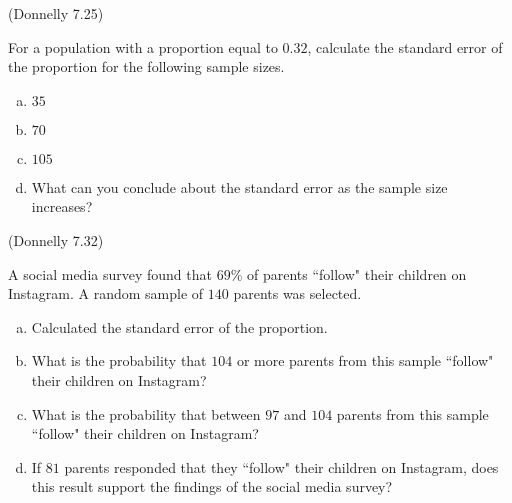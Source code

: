 \documentclass[12pt, letterpaper]{article}
\newcounter{exercise}
\theoremstyle{definition}
\begin{document}
\begin{exercise}  (Donnelly 7.25)

For a population with a proportion equal to $0.32$, calculate the standard error of the proportion for the following sample sizes.

\end{exercise}

\begin{enumerate}[(a)]

\item $35$

\vfill

\item $70$

\vfill

\item $105$

\vfill

\item What can you conclude about the standard error as the sample size increases?

\vfill

\end{enumerate}


\newpage

\begin{exercise}  (Donnelly 7.32)

A social media survey found that $69\%$ of parents ``follow" their children on Instagram.  A random sample of $140$ parents was selected.

\end{exercise}

\begin{enumerate}[(a)]

\item Calculated the standard error of the proportion.

\vfill

\item What is the probability that $104$ or more parents from this sample ``follow" their children on Instagram?

\vfill
\vfill

\item What is the probability that between $97$ and $104$ parents from this sample ``follow" their children on Instagram?

\vfill
\vfill
\vfill

\item If $81$ parents responded that they ``follow" their children on Instagram, does this result support the findings of the social media survey?

\vfill
\vfill
\vfill
\vfill

\end{enumerate}
\end{document}
